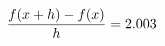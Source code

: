 \documentclass[preview]{standalone}
\begin{document}
\begin{align*}
\special{dvisvgm:raw <g id='unique000'>}\frac{f(x+h)-f(x)}{h} = 2.003\special{dvisvgm:raw </g>}
\end{align*}
\end{document}
